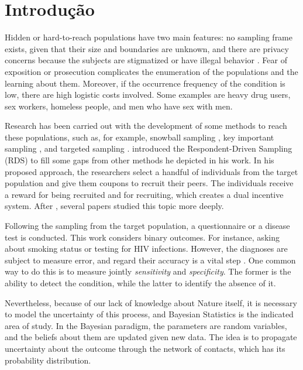\chapter{Introdução}

Hidden or hard-to-reach populations have two main features: no sampling frame
exists, given that their size and boundaries are unknown, and there are
privacy concerns because the subjects are stigmatized or have illegal behavior
\cite{heckathorn1997}. Fear of exposition or prosecution complicates the
enumeration of the populations and the learning about them. Moreover, if the
occurrence frequency of the condition is low, there are high logistic costs
involved. Some examples are heavy drug users, sex workers, homeless people,
and men who have sex with men. 

Research has been carried out with the development of some methods to reach these
populations, such as, for example, snowball sampling \cite{goodman1961}, key
important sampling \cite{deaux-callaghan1985}, 
and targeted sampling \cite{watters-biernacki1989}. \citeauthor{heckathorn1997} introduced the Respondent-Driven Sampling (RDS) to
fill some gaps from other methods he depicted in his work. In his proposed
approach, the researchers select a handful of individuals from the target
population and give them coupons to recruit their peers. The individuals
receive a reward for being recruited and for recruiting, which creates a dual
incentive system. After \cite{heckathorn1997}, several papers studied this
topic more deeply. 

Following the sampling from the target population, a questionnaire or a
disease test is conducted. This work considers binary outcomes. For
instance, asking about smoking status or testing for HIV infections. However,
the diagnoses are subject to measure error, and regard their accuracy is a
vital step \cite{reitsma2005bivariate}. One common way to do this is to
measure jointly {\em sensitivity} and {\em specificity}. The former is the
ability to detect the condition, while the latter to identify the absence of
it. 

Nevertheless, because of our lack of knowledge about Nature itself, it is
necessary to model the uncertainty of this process, and Bayesian Statistics is
the indicated area of study. In the Bayesian paradigm, the parameters are random
variables, and the beliefs about them are updated given new data. The idea is
to propagate uncertainty about the outcome through the network of contacts,
which has its probability distribution.


